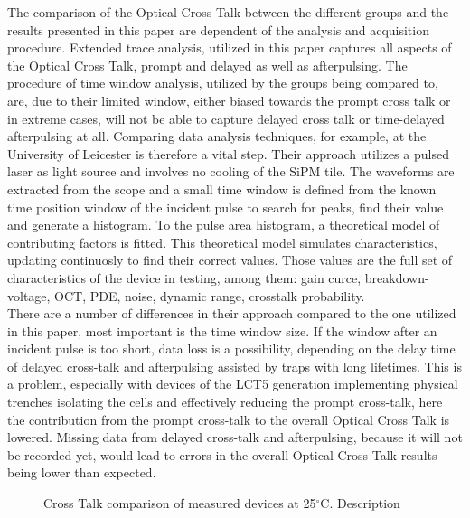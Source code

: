 \documentclass[12pt,article,type=msc,colorback,accentcolor=tud9c]{tudthesis}
\begin{document}
The comparison of the Optical Cross Talk between the different groups and the results presented in this paper are dependent of the analysis and acquisition procedure. Extended trace analysis, utilized in this paper captures all aspects of the Optical Cross Talk, prompt and delayed as well as afterpulsing. The procedure of time window analysis, utilized by the groups being compared to, are, due to their limited window, either biased towards the prompt cross talk or in extreme cases, will not be able to capture delayed cross talk or time-delayed afterpulsing at all. Comparing data analysis techniques, for example, at the University of Leicester is therefore a vital step. Their approach utilizes a pulsed laser as light source and involves no cooling of the SiPM tile. The waveforms are extracted from the scope and a small time window is defined from the known time position window of the incident pulse to search for peaks, find their value and generate a histogram. To the pulse area histogram, a theoretical model of contributing factors is fitted. This theoretical model simulates characteristics, updating continuosly to find their correct values. Those values are the full set of characteristics of the device in testing, among them: gain curce, breakdown-voltage, OCT, PDE, noise, dynamic range, crosstalk probability.\\
There are a number of differences in their approach compared to the one utilized in this paper, most important is the time window size. If the window after an incident pulse is too short, data loss is a possibility, depending on the delay time of delayed cross-talk and afterpulsing assisted by traps with long lifetimes. This is a problem, especially with devices of the LCT5 generation implementing physical trenches isolating the cells and effectively reducing the prompt cross-talk, here the contribution from the prompt cross-talk to the overall Optical Cross Talk is lowered. Missing data from delayed cross-talk and afterpulsing, because it will not be recorded yet, would lead to errors in the overall Optical Cross Talk results being lower than expected.\\


\begin{figure}[h]
\begin{centering}
\caption[OCT device comparison]{Cross Talk comparison of measured devices at 25$^\circ$C. Description}
\label{fig:DC_OCT}
\end{centering}
\end{figure}
\end{document}

